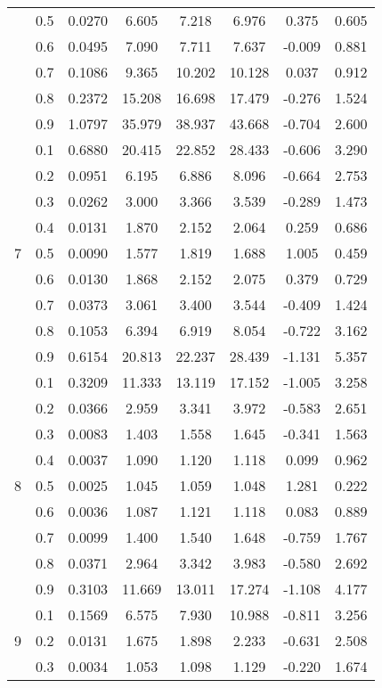 \documentclass[11pt,a4paper]{report}
\begin{document}
\begin{longtable}{ | c | c || c | c | c | c | c | c | }
 & 0.5 & 0.0270 & 6.605 & 7.218 & 6.976 & 0.375 & 0.605 \\
 & 0.6 & 0.0495 & 7.090 & 7.711 & 7.637 & -0.009 & 0.881 \\
 & 0.7 & 0.1086 & 9.365 & 10.202 & 10.128 & 0.037 & 0.912 \\
 & 0.8 & 0.2372 & 15.208 & 16.698 & 17.479 & -0.276 & 1.524 \\
 & 0.9 & 1.0797 & 35.979 & 38.937 & 43.668 & -0.704 & 2.600 \\
 \hline
\multirow{9}{*}{7} & 0.1 & 0.6880 & 20.415 & 22.852 & 28.433 & -0.606 & 3.290 \\
 & 0.2 & 0.0951 & 6.195 & 6.886 & 8.096 & -0.664 & 2.753 \\
 & 0.3 & 0.0262 & 3.000 & 3.366 & 3.539 & -0.289 & 1.473 \\
 & 0.4 & 0.0131 & 1.870 & 2.152 & 2.064 & 0.259 & 0.686 \\
 & 0.5 & 0.0090 & 1.577 & 1.819 & 1.688 & 1.005 & 0.459 \\
 & 0.6 & 0.0130 & 1.868 & 2.152 & 2.075 & 0.379 & 0.729 \\
 & 0.7 & 0.0373 & 3.061 & 3.400 & 3.544 & -0.409 & 1.424 \\
 & 0.8 & 0.1053 & 6.394 & 6.919 & 8.054 & -0.722 & 3.162 \\
 & 0.9 & 0.6154 & 20.813 & 22.237 & 28.439 & -1.131 & 5.357 \\
 \hline
\multirow{9}{*}{8} & 0.1 & 0.3209 & 11.333 & 13.119 & 17.152 & -1.005 & 3.258 \\
 & 0.2 & 0.0366 & 2.959 & 3.341 & 3.972 & -0.583 & 2.651 \\
 & 0.3 & 0.0083 & 1.403 & 1.558 & 1.645 & -0.341 & 1.563 \\
 & 0.4 & 0.0037 & 1.090 & 1.120 & 1.118 & 0.099 & 0.962 \\
 & 0.5 & 0.0025 & 1.045 & 1.059 & 1.048 & 1.281 & 0.222 \\
 & 0.6 & 0.0036 & 1.087 & 1.121 & 1.118 & 0.083 & 0.889 \\
 & 0.7 & 0.0099 & 1.400 & 1.540 & 1.648 & -0.759 & 1.767 \\
 & 0.8 & 0.0371 & 2.964 & 3.342 & 3.983 & -0.580 & 2.692 \\
 & 0.9 & 0.3103 & 11.669 & 13.011 & 17.274 & -1.108 & 4.177 \\
 \hline
\multirow{9}{*}{9} & 0.1 & 0.1569 & 6.575 & 7.930 & 10.988 & -0.811 & 3.256 \\
 & 0.2 & 0.0131 & 1.675 & 1.898 & 2.233 & -0.631 & 2.508 \\
 & 0.3 & 0.0034 & 1.053 & 1.098 & 1.129 & -0.220 & 1.674 \\

\end{longtable}
\end{document}
